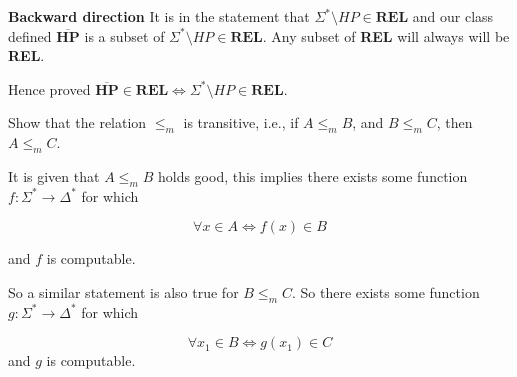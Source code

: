 \documentclass[12pt,a4, onecolumn]{exam}
\begin{document}
\begin{questions}
\begin{solution}
        \textbf{Backward direction} It is in the statement that $\Sigma^* \setminus {HP} \in \textbf{REL}$ and our class defined $\overline{\textbf{HP}}$ is a subset of $\Sigma^* \setminus {HP} \in \textbf{REL}$. Any subset of \textbf{REL} will always will be \textbf{REL}.

        Hence proved $\overline{\textbf{HP}} \in \textbf{REL} \iff \Sigma^* \setminus {HP} \in \textbf{REL}$.
    \end{solution}
    
    
    
    \question[Question - 2] Show that the  relation $\le_m$ is transitive, i.e., if $A\le_m B$, and $B\le_m C$, then $A\le_m C$.
    

    
    \begin{solution}
    It is given that $A\le_m B$ holds good, this implies there exists some function $f \colon \Sigma^* \to \Delta^*$ for which

    $$\forall x \in A \iff f(x) \in B$$

    and $f$ is computable.

    So a similar statement is also true for $B\le_m C$. So there exists some function $g \colon \Sigma^* \to \Delta^*$ for which

    $$\forall x_1 \in B \iff g(x_1) \in C$$
    and $g$ is computable.


\end{solution}
\end{questions}
\end{document}
